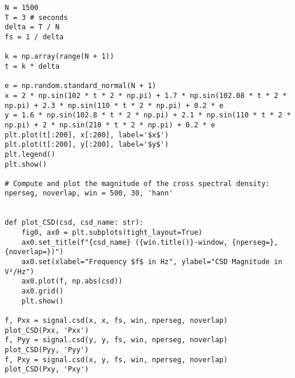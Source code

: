 {
	\vspace{-1.5em}
	\label{csd_plot_prog2}
	\begin{verbatim}
N = 1500
T = 3 # seconds
delta = T / N
fs = 1 / delta

k = np.array(range(N + 1))
t = k * delta

e = np.random.standard_normal(N + 1)
x = 2 * np.sin(102 * t * 2 * np.pi) + 1.7 * np.sin(102.08 * t * 2 * np.pi) + 2.3 * np.sin(110 * t * 2 * np.pi) + 0.2 * e
y = 1.6 * np.sin(102.8 * t * 2 * np.pi) + 2.1 * np.sin(110 * t * 2 * np.pi) + 2 * np.sin(210 * t * 2 * np.pi) + 0.2 * e
plt.plot(t[:200], x[:200], label='$x$')
plt.plot(t[:200], y[:200], label='$y$')
plt.legend()
plt.show()

# Compute and plot the magnitude of the cross spectral density:
nperseg, noverlap, win = 500, 30, 'hann'


def plot_CSD(csd, csd_name: str):
	fig0, ax0 = plt.subplots(tight_layout=True)
	ax0.set_title(f"{csd_name} ({win.title()}-window, {nperseg=}, {noverlap=})")
	ax0.set(xlabel="Frequency $f$ in Hz", ylabel="CSD Magnitude in V²/Hz")
	ax0.plot(f, np.abs(csd))
	ax0.grid()
	plt.show()

f, Pxx = signal.csd(x, x, fs, win, nperseg, noverlap)
plot_CSD(Pxx, 'Pxx')
f, Pyy = signal.csd(y, y, fs, win, nperseg, noverlap)
plot_CSD(Pyy, 'Pyy')
f, Pxy = signal.csd(x, y, fs, win, nperseg, noverlap)
plot_CSD(Pxy, 'Pxy')
	\end{verbatim}
}